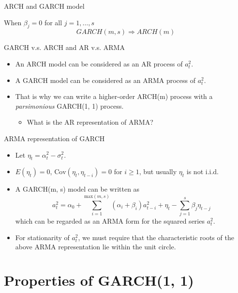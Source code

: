 \documentclass[presentation,10pt]{beamer}
\newcommand{\cov}{\mathrm{Cov}}
\begin{document}
\begin{frame}[label={sec:org443c470}]{ARCH and GARCH model}
\begin{block}{When \(\beta_j = 0\) for all \(j = 1, \ldots, s\)}
\[ GARCH(m, s) \Rightarrow ARCH(m) \]
\end{block}

\begin{block}{GARCH v.s. ARCH and AR v.s. ARMA}
\begin{itemize}
\item An ARCH model can be considered as an AR process of \(a^2_t\).
\item A GARCH model can be considered as an ARMA process of \(a^2_t\).
\item That is why we can write a higher-order ARCH(m) process with a
\emph{parsimonious} GARCH(1, 1) process. 
\begin{itemize}
\item What is the AR representation of ARMA?
\end{itemize}
\end{itemize}
\end{block}
\end{frame}
\begin{frame}[label={sec:org67c6125}]{ARMA representation of GARCH}
\begin{itemize}
\item Let \(\eta_t = \alpha^2_t - \sigma^2_t\).

\item \(E(\eta_t) = 0\), \(\cov(\eta_t, \eta_{t-i}) = 0\) for \(i \geq 1\), but
usually \(\eta_t\) is not i.i.d.

\item A GARCH(m, s) model can be written as
\begin{equation*}
a^2_t = \alpha_0 + \sum_{i=1}^{\mathrm{max}(m, s)} (\alpha_i + \beta_i) a^2_{t-i} + \eta_t - \sum_{j=1}^s \beta_j \eta_{t-j}
\end{equation*}
which can be regarded as an ARMA form for the squared series
\(a^2_t\).

\item For stationarity of \(a^2_t\), we must require that the characteristic
roots of the above ARMA representation lie within the unit circle.
\end{itemize}
\end{frame}


\section{Properties of GARCH(1, 1)}
\label{sec:org0171ce2}
\end{document}
